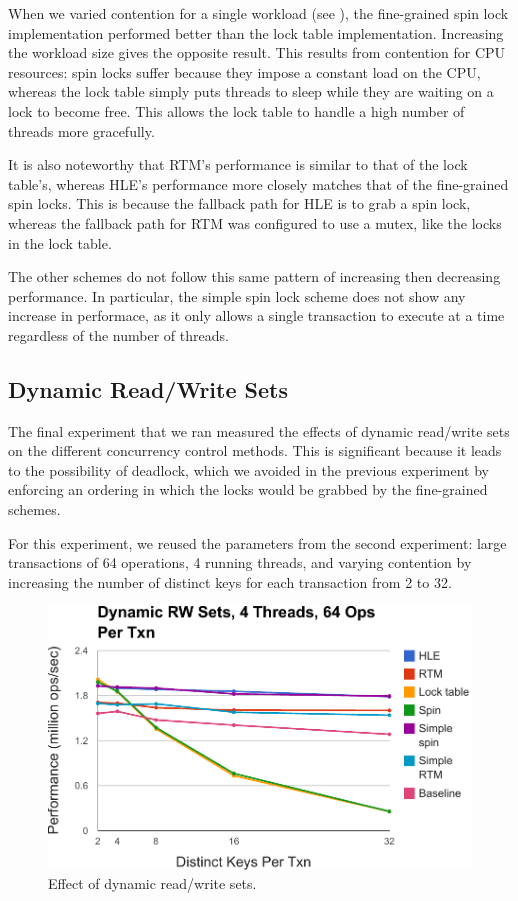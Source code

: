 When we varied contention for a single workload (see ), the
fine-grained spin lock implementation performed better than the lock table
implementation. Increasing the workload size gives the opposite result. This
results from contention for CPU resources: spin locks suffer because they impose
a constant load on the CPU, whereas the lock table simply puts threads to sleep
while they are waiting on a lock to become free. This allows the lock table to
handle a high number of threads more gracefully.

It is also noteworthy that RTM's performance is similar to that of the lock
table's, whereas HLE's performance more closely matches that of the fine-grained
spin locks.  This is because the fallback path for HLE is to grab a 
spin lock, whereas the fallback path for RTM was configured to use a 
mutex, like the locks in the lock table.

The other schemes do not follow this same pattern of increasing then decreasing
performance. In particular, the simple spin lock scheme does not show any
increase in performace, as it only allows a single transaction to execute at a
time regardless of the number of threads.

\subsection{Dynamic Read/Write Sets}

The final experiment that we ran measured the effects of dynamic read/write sets
on the different concurrency control methods. This is significant because it
leads to the possibility of deadlock, which we avoided in the previous
experiment by enforcing an ordering in which the locks would be grabbed by the
fine-grained schemes.

For this experiment, we reused the parameters from the second experiment:
large transactions of 64 operations, 4 running threads, and varying 
contention by increasing the number of distinct keys for each transaction 
from 2 to 32.

\begin{figure}[h!]
  \centering
  \includegraphics[scale=0.575]{figure/dynamic.pdf}
  \caption{Effect of dynamic read/write sets.}
  \label{fig:dynamic} 
\end{figure}

